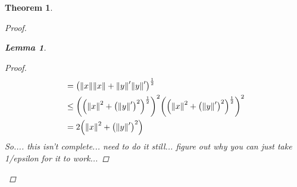\documentclass[]{article}
\newcommand{\R}{\mathbb{R}}
\newtheorem{theorem}{Theorem}
\newtheorem{lemma}{Lemma}
\begin{document}
\begin{theorem}
\begin{proof}
\begin{lemma}
\begin{proof}
\begin{align*}
                        &= \qty(\norm{x} \norm{x} + \norm{y}' \norm{y}')^{\frac{1}{2}}\\
                        &\leq \qty(\qty(\norm{x}^2 + \qty(\norm{y}')^2)^{\frac{1}{2}})^2 \qty(\qty(\norm{x}^2 + \qty(\norm{y}')^2)^{\frac{1}{2}})^2\\
                        &= 2\qty(\norm{x}^2 + \qty(\norm{y}')^2)
                \end{align*}
                So.... this isn't complete... need to do it still... figure out why you can just take 1/epsilon for it to work...
            \end{proof}
        \end{lemma}

\end{proof}
\end{theorem}
\end{document}
